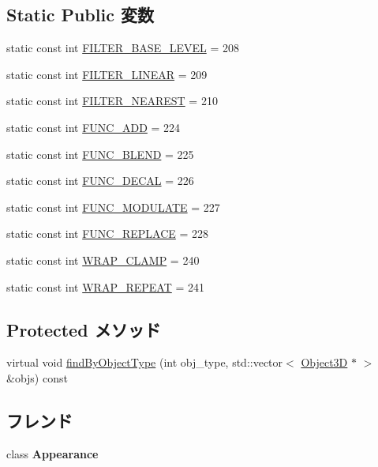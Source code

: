 \subsection*{Static Public 変数}
\begin{CompactItemize}
\item 
static const int \hyperlink{classm3g_1_1Texture2D_d1924d32385b5353ad11ecd8b1ec0ad5}{FILTER\_\-BASE\_\-LEVEL} = 208
\item 
static const int \hyperlink{classm3g_1_1Texture2D_5f06003f50141919a3665d22f55602a8}{FILTER\_\-LINEAR} = 209
\item 
static const int \hyperlink{classm3g_1_1Texture2D_1ee2e06d6462fdafd5f17e63eddfb8fe}{FILTER\_\-NEAREST} = 210
\item 
static const int \hyperlink{classm3g_1_1Texture2D_825ea3aff59f79958257ac557c802760}{FUNC\_\-ADD} = 224
\item 
static const int \hyperlink{classm3g_1_1Texture2D_57e3e01014bbfd62b8665586fdd2ecb3}{FUNC\_\-BLEND} = 225
\item 
static const int \hyperlink{classm3g_1_1Texture2D_235b942b18219513ca4a5a8c1a3171ac}{FUNC\_\-DECAL} = 226
\item 
static const int \hyperlink{classm3g_1_1Texture2D_4482b0d4d6d1f64aaf33c3c5862de30e}{FUNC\_\-MODULATE} = 227
\item 
static const int \hyperlink{classm3g_1_1Texture2D_14f24332e168c5e210ddad47fb5cdd17}{FUNC\_\-REPLACE} = 228
\item 
static const int \hyperlink{classm3g_1_1Texture2D_e36d8facf5b60eb6c59888121731c438}{WRAP\_\-CLAMP} = 240
\item 
static const int \hyperlink{classm3g_1_1Texture2D_b37ff061b9fb272284c4c389deec9266}{WRAP\_\-REPEAT} = 241
\end{CompactItemize}
\subsection*{Protected メソッド}
\begin{CompactItemize}
\item 
virtual void \hyperlink{classm3g_1_1Texture2D_4dadb21b568b0230fac106f15040138c}{findByObjectType} (int obj\_\-type, std::vector$<$ \hyperlink{classm3g_1_1Object3D}{Object3D} $\ast$ $>$ \&objs) const 
\end{CompactItemize}
\subsection*{フレンド}
\begin{CompactItemize}
\item 
\hypertarget{classm3g_1_1Texture2D_afa5201a494f65c37039281d9b63a2a9}{
class \textbf{Appearance}}
\label{classm3g_1_1Texture2D_afa5201a494f65c37039281d9b63a2a9}

\end{CompactItemize}


